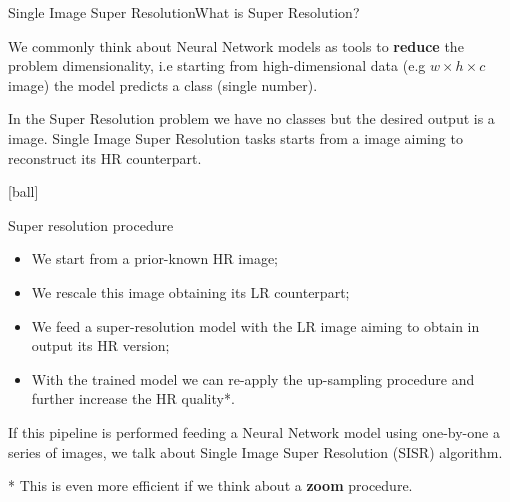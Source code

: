 \documentclass{standalone}
\begin{document}
\begin{frame}{Single Image Super Resolution}{What is Super Resolution?}


  \scriptsize{We commonly think about Neural Network models as tools to \textbf{reduce} the problem dimensionality, i.e starting from high-dimensional data (e.g $w\times h\times c$ image) the model predicts a class (single number)}.

  \scriptsize{In the Super Resolution problem we have no classes but the desired output is a image.}
  \scriptsize{Single Image Super Resolution tasks starts from a image aiming to reconstruct its HR counterpart.}

  [ball]

  \begin{exampleblock}{Super resolution procedure}
    \begin{itemize}

      \item We start from a prior-known HR image;
      \item We rescale this image obtaining its LR counterpart;
      \item We feed a super-resolution model with the LR image aiming to obtain in output its HR version;
      \item With the trained model we can re-apply the up-sampling procedure and further increase the HR quality*.

    \end{itemize}
  \end{exampleblock}

  \scriptsize{If this pipeline is performed feeding a Neural Network model using one-by-one a series of images, we talk about Single Image Super Resolution (SISR) algorithm.}

  \vspace{0.5cm}
  \scriptsize{* This is even more efficient if we think about a \textbf{zoom} procedure.}

\end{frame}
\end{document}
